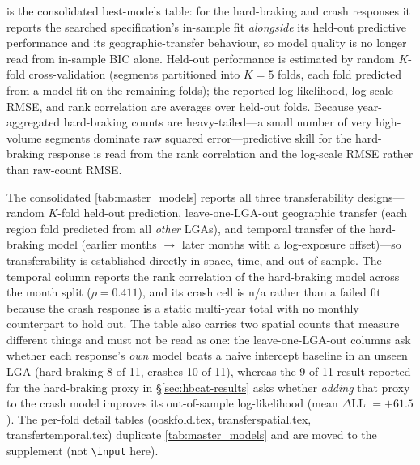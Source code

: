 \documentclass[letterpaper,8pt]{extarticle}  %
\newcommand{\file}[1]{{\ttfamily\def\_{\textunderscore\allowbreak}#1}}
\begin{document}
\begin{doublespacing}
\begin{linenumbers}
\begin{table}[!ht]
  \centering
  \caption{Full-year hard-braking telematics coverage by month (segment-matched events).}\label{tab:hb_year_prov}\small
  
\end{table}

\FloatBarrier

 is the consolidated best-models table: for the hard-braking and crash responses it reports the searched specification's in-sample fit \emph{alongside} its held-out predictive performance and its geographic-transfer behaviour, so model quality is no longer read from in-sample BIC alone. Held-out performance is estimated by random $K$-fold cross-validation (segments partitioned into $K=5$ folds, each fold predicted from a model fit on the remaining folds); the reported log-likelihood, log-scale RMSE, and rank correlation are averages over held-out folds. Because year-aggregated hard-braking counts are heavy-tailed---a small number of very high-volume segments dominate raw squared error---predictive skill for the hard-braking response is read from the rank correlation and the log-scale RMSE rather than raw-count RMSE.

\begin{table}[!ht]
  \centering
  \caption{Best models on the full-year data: in-sample fit, held-out ($K$-fold) prediction, leave-one-LGA-out geographic transfer, and temporal transfer of the hard-braking model. The temporal cell of the crash row is n/a because the crash counts are a static multi-year total with no month split.}\label{tab:master_models}\small
  
\end{table}

The consolidated \cref{tab:master_models} reports all three transferability designs---random $K$-fold held-out prediction, leave-one-LGA-out geographic transfer (each region fold predicted from all \emph{other} LGAs), and temporal transfer of the hard-braking model (earlier months $\to$ later months with a log-exposure offset)---so transferability is established directly in space, time, and out-of-sample. The temporal column reports the rank correlation of the hard-braking model across the month split ($\rho=0.411$), and its crash cell is n/a rather than a failed fit because the crash response is a static multi-year total with no monthly counterpart to hold out. The table also carries two spatial counts that measure different things and must not be read as one: the leave-one-LGA-out columns ask whether each response's \emph{own} model beats a naive intercept baseline in an unseen LGA (hard braking 8 of 11, crashes 10 of 11), whereas the 9-of-11 result reported for the hard-braking proxy in \S\ref{sec:hbcat-results} asks whether \emph{adding} that proxy to the crash model improves its out-of-sample log-likelihood (mean $\Delta$LL $=+61.5$). The per-fold detail tables (\file{oos\_kfold.tex}, \file{transfer\_spatial.tex}, \file{transfer\_temporal.tex}) duplicate \cref{tab:master_models} and are moved to the supplement (not \texttt{\textbackslash input} here).


\end{linenumbers}
\end{doublespacing}
\end{document}
